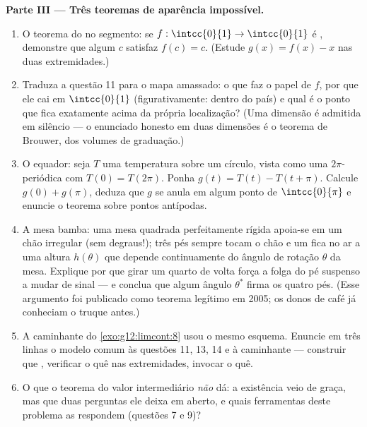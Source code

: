 \begin{problem}
\medskip
\noindent\textbf{Parte III --- Três teoremas de aparência
impossível.}
\begin{enumerate}[resume]
  \item O teorema do  no segmento: se
        $f : \intcc{0}{1} \to \intcc{0}{1}$ é ,
        demonstre que algum $c$ satisfaz $f(c) = c$. (Estude
        $g(x) = f(x) - x$ nas duas extremidades.)
  \item Traduza a questão 11 para o mapa amassado: o que faz o
        papel de $f$, por que ele cai em $\intcc{0}{1}$
        (figurativamente: dentro do país) e qual é o ponto que
        fica exatamente acima da própria localização? (Uma
        dimensão é admitida em silêncio --- o enunciado honesto
        em duas dimensões é o teorema de Brouwer, dos volumes de
        graduação.)
  \item O equador: seja $T$ uma temperatura  sobre um
        círculo, vista como uma  $2\pi$-periódica com
        $T(0) = T(2\pi)$. Ponha $g(t) = T(t) - T(t + \pi)$.
        Calcule $g(0) + g(\pi)$, deduza que $g$ se anula em algum
        ponto de $\intcc{0}{\pi}$ e enuncie o teorema sobre
        pontos antípodas.
  \item A mesa bamba: uma mesa quadrada perfeitamente rígida
        apoia-se em um chão irregular  (sem degraus!);
        três pés sempre tocam o chão e um fica no ar a uma altura
        $h(\theta)$ que depende continuamente do ângulo de
        rotação $\theta$ da mesa. Explique por que girar um
        quarto de volta força a folga do pé suspenso a mudar de
        sinal --- e conclua que algum ângulo $\theta^*$ firma os
        quatro pés. (Esse argumento foi publicado como teorema
        legítimo em 2005; os donos de café já conheciam o truque
        antes.)
  \item A caminhante do \cref{exo:g12:limcont:8} usou o mesmo
        esquema. Enuncie em três linhas o modelo comum às
        questões 11, 13, 14 e à caminhante --- construir que
        , verificar o quê nas extremidades, invocar o quê.
  \item O que o teorema do valor intermediário \emph{não} dá: a
        existência veio de graça, mas que duas perguntas ele
        deixa em aberto, e quais ferramentas deste problema as
        respondem (questões 7 e 9)?
\end{enumerate}


\end{problem}
